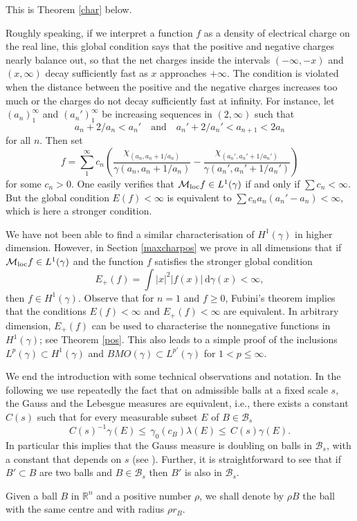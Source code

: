 \documentclass{amsart}                 %
\numberwithin{equation}{section}
\renewcommand\mod[1]{\left\vert{#1}\right\vert}
\newcommand\wrt{\,\mathrm{d}}
\newcommand\1{{\bf 1}}
\newcommand\BR{\mathbb{R}} \newcommand\BRd{\mathbb{R}^d}
\newcommand\cB{\mathcal{B}}  \newcommand\fB{\mathfrak{B}}
\newcommand\cM{\mathcal{M}}  \newcommand\fM{\mathfrak{M}}
\newcommand\mlo {\cM_{\textnormal{loc}}}
\newcommand\ga{\gamma}    \newcommand\Ga{\Gamma}
\newcommand\huat[1]{H^1(#1)}
\begin{document}
This is Theorem \ref{char} below.
\par
Roughly speaking, if we interpret a function $f$ as a density of electrical charge 
on the real line, this global condition says  that   the positive and 
negative charges nearly balance out, so that the net charges inside the 
intervals  $(-\infty,-x)$ and $(x,\infty)$ decay sufficiently fast as $x$ 
approaches $+\infty$. The 
condition is violated when the distance between the positive and the 
negative charges increases too much or the charges do not decay 
sufficiently fast at infinity. 
For instance, let $(a_n)_1^\infty$ and $(a_n')_1^\infty$ be increasing
sequences in $(2, \infty)$ such that 
\[
a_n + 2/a_n < a_n' \quad \mathrm{and} \quad a_n' + 2/a_n' < a_{n+1} < 2a_n
\]
for all $n$. Then set
\begin{equation}
  \label{eq:ex}
  f = \sum_1^\infty c_n \left(\frac{\chi_{(a_n,a_n+1/a_n)}}{\ga(a_n,a_n+1/a_n)}
-\frac{\chi_{(a_n',a_n'+1/a_n')}}{\ga(a_n',a_n'+1/a_n')}\right)
\end{equation}
for some $c_n > 0$. One easily verifies that  $\mlo f \in L^1(\ga)$ 
if and only if $\sum c_n < \infty$. But the global condition $E(f) < \infty$
is equivalent to $\sum c_n a_n(a_n' - a_n) < \infty$, which is here  a
stronger condition.
\par\medskip


We have not been able to find a similar characterisation of $\huat
{\gamma}$ in higher dimension. However, in Section \ref{maxcharpos} 
we prove in all dimensions that if $\mlo{f} \in L^1(\gamma)$ and the 
function $f$ 
satisfies the stronger global condition
$$
E_+(f)=\int \mod{x}^2 \mod{f(x)}\wrt\gamma(x)<\infty,
$$
then $f \in \huat{\gamma}$.  Observe that for $n=1$ and $f \ge 0$,
Fubini's theorem implies that the conditions $E(f)<\infty$ and 
$E_+(f)<\infty$ are equivalent. In arbitrary dimension, $E_+(f)$  can
be used to characterise the nonnegative functions in $\huat{\gamma}$;
see Theorem \ref{pos}.
This also leads to a simple proof of the inclusions $L^p
(\gamma)\subset \huat{\gamma}$ and 
$BMO(\gamma)\subset L^{p'}(\gamma)$ for $1<p\le\infty$.

We end the introduction with some technical observations and notation.
In the following we use repeatedly the fact that on 
admissible balls at a fixed scale $s$, the Gauss and the Lebesgue 
measures are equivalent, i.e., there exists a constant $C(s)$ such that 
for every measurable subset $E$ of $B\in\cB_s$
\begin{equation}\label{lgeq}
C(s)^{-1} \gamma(E)\le \,\gamma_0(c_B) \lambda(E)\le\,C(s)\gamma
(E).
\end{equation}
In particular this implies that the Gauss measure is doubling on balls 
in $\cB_s$, with a  constant that depends on $s$ (see \cite
[{Prop. 2.1}]{MM}). Further, it is straightforward to see that if $B'\subset B$
are two balls and $B\in \cB_s$ then $B'$ is also in $\cB_s$.
\par
Given a ball $B$ in $\BR^n$ and a positive number $\rho$, we shall 
denote by $\rho B$ the ball with the same centre and with radius $\rho 
r_B$.
\end{document}
